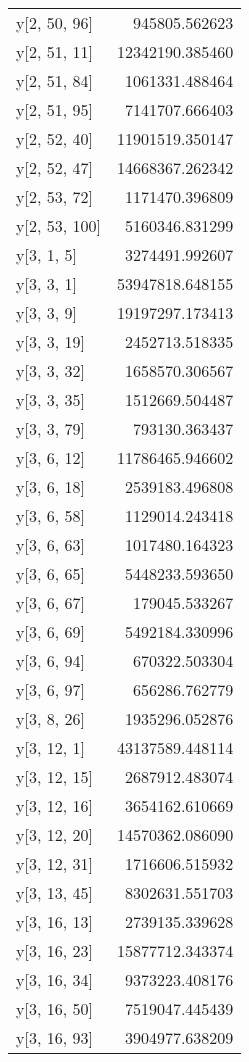 \begin{longtable}{lr}
y[2, 50, 96] & 945805.562623 \\
y[2, 51, 11] & 12342190.385460 \\
y[2, 51, 84] & 1061331.488464 \\
y[2, 51, 95] & 7141707.666403 \\
y[2, 52, 40] & 11901519.350147 \\
y[2, 52, 47] & 14668367.262342 \\
y[2, 53, 72] & 1171470.396809 \\
y[2, 53, 100] & 5160346.831299 \\
y[3, 1, 5] & 3274491.992607 \\
y[3, 3, 1] & 53947818.648155 \\
y[3, 3, 9] & 19197297.173413 \\
y[3, 3, 19] & 2452713.518335 \\
y[3, 3, 32] & 1658570.306567 \\
y[3, 3, 35] & 1512669.504487 \\
y[3, 3, 79] & 793130.363437 \\
y[3, 6, 12] & 11786465.946602 \\
y[3, 6, 18] & 2539183.496808 \\
y[3, 6, 58] & 1129014.243418 \\
y[3, 6, 63] & 1017480.164323 \\
y[3, 6, 65] & 5448233.593650 \\
y[3, 6, 67] & 179045.533267 \\
y[3, 6, 69] & 5492184.330996 \\
y[3, 6, 94] & 670322.503304 \\
y[3, 6, 97] & 656286.762779 \\
y[3, 8, 26] & 1935296.052876 \\
y[3, 12, 1] & 43137589.448114 \\
y[3, 12, 15] & 2687912.483074 \\
y[3, 12, 16] & 3654162.610669 \\
y[3, 12, 20] & 14570362.086090 \\
y[3, 12, 31] & 1716606.515932 \\
y[3, 13, 45] & 8302631.551703 \\
y[3, 16, 13] & 2739135.339628 \\
y[3, 16, 23] & 15877712.343374 \\
y[3, 16, 34] & 9373223.408176 \\
y[3, 16, 50] & 7519047.445439 \\
y[3, 16, 93] & 3904977.638209 \\

\end{longtable}
